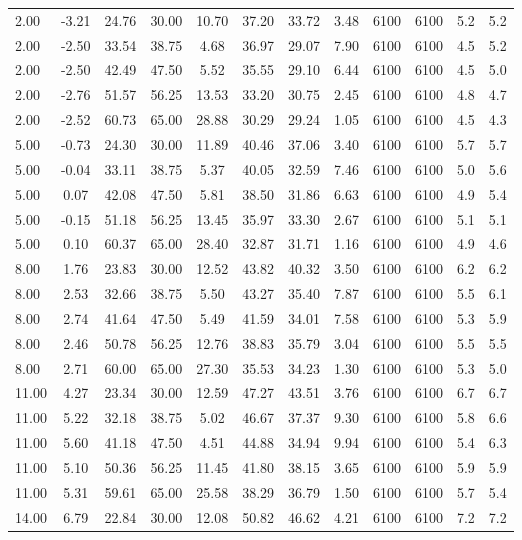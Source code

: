\documentclass[english]{SPFShortReport}
\begin{document}
\begin{table}[!ht]
\begin{small}
\begin{center}
{\begin{tabular}{l | c c c c c c c c c c c }
2.00 & -3.21 & 24.76 & 30.00 & 10.70 & 37.20 & 33.72 & 3.48 & 6100 & 6100 & 5.2 & 5.2\\ 
2.00 & -2.50 & 33.54 & 38.75 & 4.68 & 36.97 & 29.07 & 7.90 & 6100 & 6100 & 4.5 & 5.2\\ 
2.00 & -2.50 & 42.49 & 47.50 & 5.52 & 35.55 & 29.10 & 6.44 & 6100 & 6100 & 4.5 & 5.0\\ 
2.00 & -2.76 & 51.57 & 56.25 & 13.53 & 33.20 & 30.75 & 2.45 & 6100 & 6100 & 4.8 & 4.7\\ 
2.00 & -2.52 & 60.73 & 65.00 & 28.88 & 30.29 & 29.24 & 1.05 & 6100 & 6100 & 4.5 & 4.3\\ 
5.00 & -0.73 & 24.30 & 30.00 & 11.89 & 40.46 & 37.06 & 3.40 & 6100 & 6100 & 5.7 & 5.7\\ 
5.00 & -0.04 & 33.11 & 38.75 & 5.37 & 40.05 & 32.59 & 7.46 & 6100 & 6100 & 5.0 & 5.6\\ 
5.00 & 0.07 & 42.08 & 47.50 & 5.81 & 38.50 & 31.86 & 6.63 & 6100 & 6100 & 4.9 & 5.4\\ 
5.00 & -0.15 & 51.18 & 56.25 & 13.45 & 35.97 & 33.30 & 2.67 & 6100 & 6100 & 5.1 & 5.1\\ 
5.00 & 0.10 & 60.37 & 65.00 & 28.40 & 32.87 & 31.71 & 1.16 & 6100 & 6100 & 4.9 & 4.6\\ 
8.00 & 1.76 & 23.83 & 30.00 & 12.52 & 43.82 & 40.32 & 3.50 & 6100 & 6100 & 6.2 & 6.2\\ 
8.00 & 2.53 & 32.66 & 38.75 & 5.50 & 43.27 & 35.40 & 7.87 & 6100 & 6100 & 5.5 & 6.1\\ 
8.00 & 2.74 & 41.64 & 47.50 & 5.49 & 41.59 & 34.01 & 7.58 & 6100 & 6100 & 5.3 & 5.9\\ 
8.00 & 2.46 & 50.78 & 56.25 & 12.76 & 38.83 & 35.79 & 3.04 & 6100 & 6100 & 5.5 & 5.5\\ 
8.00 & 2.71 & 60.00 & 65.00 & 27.30 & 35.53 & 34.23 & 1.30 & 6100 & 6100 & 5.3 & 5.0\\ 
11.00 & 4.27 & 23.34 & 30.00 & 12.59 & 47.27 & 43.51 & 3.76 & 6100 & 6100 & 6.7 & 6.7\\ 
11.00 & 5.22 & 32.18 & 38.75 & 5.02 & 46.67 & 37.37 & 9.30 & 6100 & 6100 & 5.8 & 6.6\\ 
11.00 & 5.60 & 41.18 & 47.50 & 4.51 & 44.88 & 34.94 & 9.94 & 6100 & 6100 & 5.4 & 6.3\\ 
11.00 & 5.10 & 50.36 & 56.25 & 11.45 & 41.80 & 38.15 & 3.65 & 6100 & 6100 & 5.9 & 5.9\\ 
11.00 & 5.31 & 59.61 & 65.00 & 25.58 & 38.29 & 36.79 & 1.50 & 6100 & 6100 & 5.7 & 5.4\\ 
14.00 & 6.79 & 22.84 & 30.00 & 12.08 & 50.82 & 46.62 & 4.21 & 6100 & 6100 & 7.2 & 7.2\\ 

\end{tabular}}
\end{center}
\end{small}
\end{table}
\end{document}
